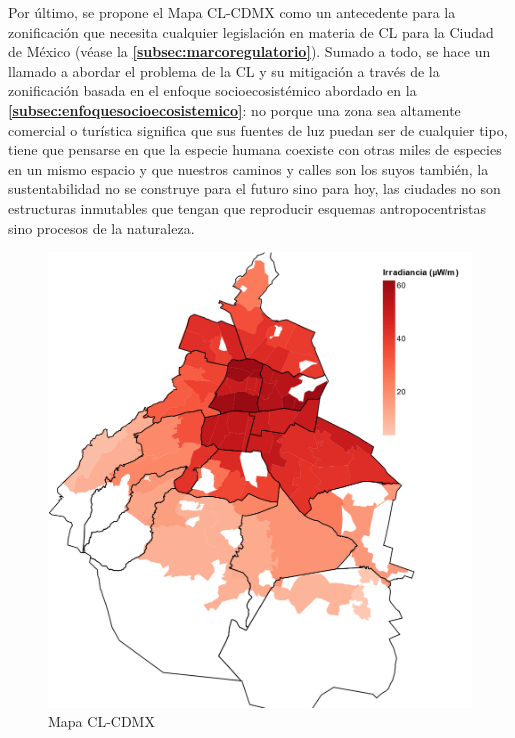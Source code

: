 Por último, se propone el Mapa CL-CDMX como un antecedente para la zonificación que necesita cualquier legislación en materia de CL para la Ciudad de México (véase la \textbf{\autoref{subsec:marcoregulatorio}}). Sumado a todo, se hace un llamado a abordar el problema de la CL y su mitigación a través de la zonificación basada en el enfoque socioecosistémico abordado en la \textbf{\autoref{subsec:enfoquesocioecosistemico}}: no porque una zona sea altamente comercial o turística significa que sus fuentes de luz puedan ser de cualquier tipo, tiene que pensarse en que la especie humana coexiste con otras miles de especies en un mismo espacio y que nuestros caminos y calles son los suyos también, la sustentabilidad no se construye para el futuro sino para hoy, las ciudades no son estructuras inmutables que tengan que reproducir esquemas antropocentristas sino procesos de la naturaleza. 

\newpage

\vspace{100mm} 

\begin{figure}[H]
  \centering
    \includegraphics[width=1\textwidth]{MapaCLCDMX}
  \caption{Mapa CL-CDMX} 
  \label{MapaCLDMX}
\end{figure}

\newpage